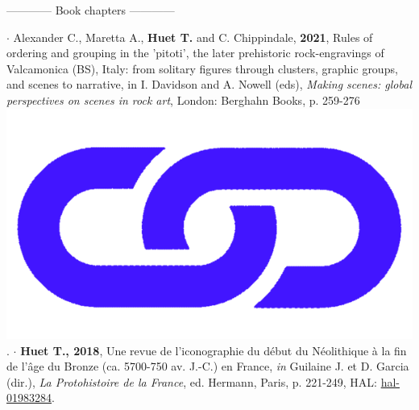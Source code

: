 \documentclass{article}
\begin{document}
\bigbreak
\begin{center}------------ Book chapters ------------\end{center}
\smallbreak
$\cdot$ Alexander C., Maretta A., \textbf{Huet T.} and C. Chippindale, \textbf{2021}, Rules of ordering and grouping in the 'pitoti', the later prehistoric rock-engravings of Valcamonica (BS), Italy: from solitary figures through clusters, graphic groups, and scenes to narrative, in I. Davidson and A. Nowell (eds), \textit{Making scenes: global perspectives on scenes in rock art}, London: Berghahn Books, p. 259-276 \href{https://www.berghahnbooks.com/title/DavidsonMaking}{\includegraphics[scale=0.02]{link_darkblue.png}}.
\smallbreak
$\cdot$ \textbf{Huet T., 2018}, Une revue de l'iconographie du d\'{e}but du N\'{e}olithique \`{a} la fin de l'\^{a}ge du Bronze (ca. 5700-750 av. J.-C.) en France, \textit{in} Guilaine J. et D. Garcia (dir.), \textit{La Protohistoire de la France}, ed. Hermann, Paris, p. 221-249, HAL: \href{https://hal.archives-ouvertes.fr/hal-01983284}{hal-01983284}.
\bigbreak
\end{document}
